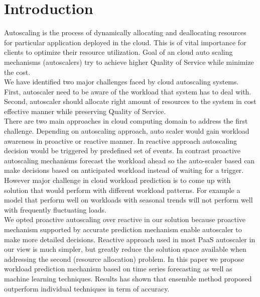 \section{Introduction}
Autoscaling is the process of dynamically allocating and deallocating resources for particular application deployed in the cloud. This is of vital importance for clients to optimize their resource utilization.  Goal of an cloud auto scaling mechanisms (autoscalers) try to achieve higher Quality of Service while minimize the cost. \\

We have identified two major challenges faced by cloud autoscaling systems. First, autoscaler need to be aware of the workload that system has to deal with. Second, autoscaler should  allocate right amount of resources to the system in cost effective manner while preserving Quality of Service. \\

There are two main approaches in cloud computing domain to address the first challenge. Depending on autoscaling approach, auto scaler would gain workload awareness in proactive or reactive manner. In reactive approach autoscaling decision would be triggered by predefined set of events. In contrast proactive autoscaling mechanisms forecast the workload ahead so the auto-scaler based can make decisions based on anticipated workload instead of waiting for a trigger. However major challenge in cloud workload prediction is to come up with solution that would perform with different workload patterns. For example a model that perform well on workloads with seasonal trends will not perform well with frequently fluctuating loads. \\

We opted proactive autoscaling over reactive in our solution because proactive mechanism supported by accurate prediction mechanism enable autoscaler to make more detailed decisions.
Reactive approach used in most PaaS autoscaler in our view is much simpler, but greatly reduce the solution space available when addressing the second (resource allocation) problem. In this paper we propose  workload prediction mechanism based on time series forecasting as well as machine learning techniques. Results has shown that ensemble method proposed outperform individual techniques in term of accuracy.\\

